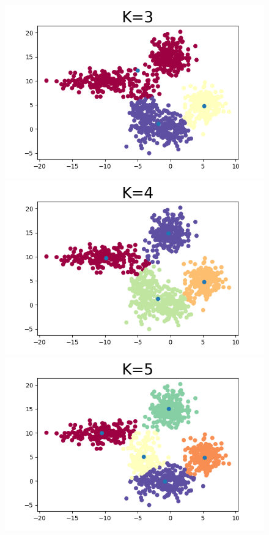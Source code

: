 \documentclass[conference]{IEEEtran}
\begin{document}
\begin{figure}[h]
	\centering
	{\includegraphics[scale=0.28]{k=3}}
	{\includegraphics[scale=0.28]{k=4}}
	{\includegraphics[scale=0.28]{k=5}}

\end{figure}
\end{document}
